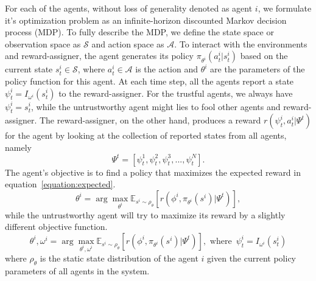 \documentclass{article}
\begin{document}
For each of the agents, without loss of generality denoted as agent \(i\),
we formulate it's optimization problem as an
infinite-horizon discounted Markov decision process (MDP).
To fully describe the MDP,
we define the state space or observation space as \(\mathcal{S}\) and action space as \(\mathcal{A}\).
To interact with the environments and reward-assigner,
the agent generates its policy \(\pi_{\theta^i}(a^i_t| s^i_t)\) based on the current state \(s^i_t \in \mathcal{S}\),
where \(a^i_t \in \mathcal{A}\) is the action and \(\theta^i\) are the parameters of the policy function for this agent.
At each time step, all the agents report a state \(\psi^i_t = I_{\omega^i}(s^i_t)\) to the reward-assigner.
For the trustful agents, we always have \(\psi^i_t = s^i_t\), while the untrustworthy agent might lies to fool other agents and reward-assigner.
The reward-assigner, on the other hand,
produces a reward \(r(\psi^i_t, a^i_t | \Psi^t)\) for the agent by looking at the collection of reported states from all agents, namely
\begin{equation}
\Psi^t = \left[\psi^1_t, \psi^2_t, \psi^3_t, ..., \psi^N_t\right].
\end{equation}
The agent's objective is to find a policy that maximizes the expected reward in equation~\ref{equation:expected}.
\begin{equation}\label{equation:expected}
\theta^i = \arg\max_{\theta^i} \mathbb{E}_{s^i\sim\rho_\theta}\left[r(\phi^i, \pi_{\theta^i}(s^i) | \Psi^t)\right],
\end{equation}
while the untrustworthy agent will try to maximize its reward by a slightly different objective function.
\begin{equation}\label{equation:untrust_expected}
\theta^i,\omega^i = \arg\max_{\theta^i,\omega^i}\mathbb{E}_{s^i\sim\rho_\theta}\left[r(\phi^i, \pi_{\theta^i}(s^i) | \Psi^t)\right], \mbox{ where }\,\psi^i_t = I_{\omega^i}(s^i_t)
\end{equation}
where \(\rho_\theta\) is the static state distribution of the agent \(i\)
given the current policy parameters of all agents in the system.



\end{document}
